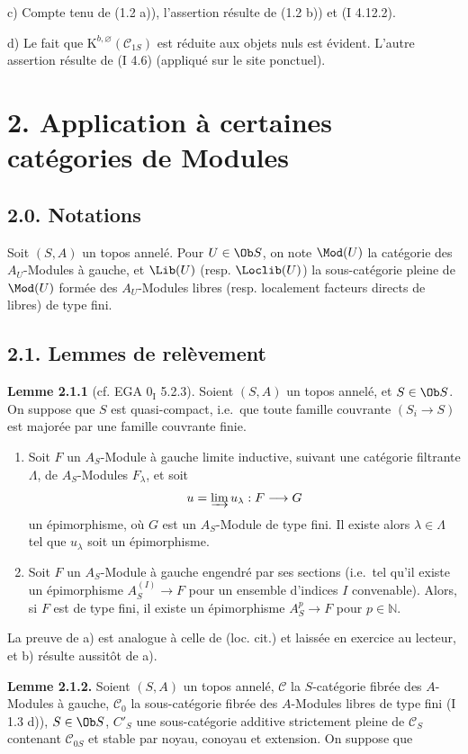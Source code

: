 c)
Compte tenu de (1.2 a)), l'assertion résulte de (1.2 b)) et (I 4.12.2).

d) Le fait que $\mathrm K^{b,\varnothing}(\mathcal C_{1S})$ est réduite aux objets nuls est évident. L'autre assertion résulte de (I 4.6) (appliqué sur le site ponctuel).

\section*{2. Application à certaines catégories de Modules}
\subsection*{2.0. Notations}
Soit $(S,A)$ un topos annelé. Pour $U\in\Ob S$, on note $\Mod(U)$ la catégorie des $A_U$-Modules à gauche, et $\Lib(U)$ (resp. $\Loclib(U)$) la sous-catégorie pleine de $\Mod(U)$ formée des $A_U$-Modules libres (resp. localement facteurs directs de libres) de type fini.

\subsection*{2.1. Lemmes de relèvement}

\textbf{Lemme 2.1.1} (cf. EGA $0_{\mathrm I}$ 5.2.3). Soient $(S,A)$ un topos annelé, et $S\in\Ob S$. On suppose que $S$ est quasi-compact, i.e.\ que toute famille couvrante $(S_i\to S)$ est majorée par une famille couvrante finie.
\begin{enumerate}[label=\alph*)]
\item Soit $F$ un $A_S$-Module à gauche limite inductive, suivant une catégorie filtrante $\Lambda$, de $A_S$-Modules $F_\lambda$, et soit
\[
u=\varinjlim u_\lambda:F\longrightarrow G
\]
un épimorphisme, où $G$ est un $A_S$-Module de type fini. Il existe alors $\lambda\in\Lambda$ tel que $u_\lambda$ soit un épimorphisme.
\item Soit $F$ un $A_S$-Module à gauche engendré par ses sections (i.e.\ tel qu'il existe un épimorphisme $A_S^{(I)}\to F$ pour un ensemble d'indices $I$ convenable). Alors, si $F$ est de type fini, il existe un épimorphisme $A_S^p\to F$ pour $p\in\mathbb N$.
\end{enumerate}
La preuve de a) est analogue à celle de (loc. cit.) et laissée en exercice au lecteur, et b) résulte aussitôt de a).

\textbf{Lemme 2.1.2.} Soient $(S,A)$ un topos annelé, $\mathcal C$ la $S$-catégorie fibrée des $A$-Modules à gauche, $\mathcal C_0$ la sous-catégorie fibrée des $A$-Modules libres de type fini (I 1.3 d)), $S\in\Ob S$, $C'_S$ une sous-catégorie additive strictement pleine de $\mathcal C_S$ contenant $\mathcal C_{0S}$ et stable par noyau, conoyau et extension. On suppose que
